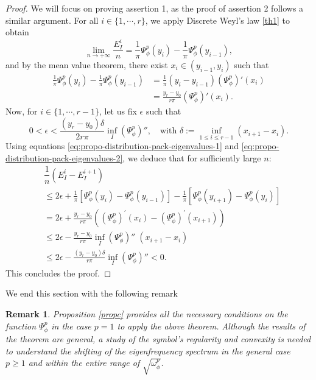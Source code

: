 \documentclass[11pt]{article}
\newtheorem{remark}{Remark}[section]
\begin{document}
\begin{proof}
We will focus on proving assertion 1, as the proof of assertion 2 follows a similar argument. For all $i \in \{1, \cdots, r\}$, we apply Discrete Weyl's law \ref{th1} to obtain
\begin{equation} \label{eq:propo-distribution-pack-eigenvalues-1}
\lim_{n\rightarrow  +\infty}\dfrac{E_I^{i}}{n}=\frac{1}{\pi}  \Psi^p_{\phi}(y_{i})-\frac{1}{\pi}  \Psi^p_{\phi}(y_{i-1}),
\end{equation}
and by the mean value theorem, there exist $x_i \in (y_{i-1}, y_i)$ such that
\begin{equation} \label{eq:propo-distribution-pack-eigenvalues-2}
\begin{split}
\frac{1}{\pi}  \Psi^p_{\phi}(y_{i})-\frac{1}{\pi}  \Psi^p_{\phi}(y_{i-1}) &= \frac{1}{\pi}(y_{i}-y_{i-1}) \left(  \Psi^p_{\phi}\right)'(x_i)\\
&= \frac{y_r-y_0}{r\pi}\left(  \Psi^p_{\phi}\right)'(x_i).
\end{split}
\end{equation}
Now, for $i \in \{1, \cdots, r-1\}$, let us fix $\epsilon$ such that
$$
0 < \epsilon < \frac{(y_r-y_0) \delta}{2r\pi} \inf_{I} \left(  \Psi^p_{\phi}   \right)'', \quad \text{with } \delta:= \inf_{1 \leq i \leq r-1} (x_{i+1} -x_{i} ). 
$$
Using equations \eqref{eq:propo-distribution-pack-eigenvalues-1} and \eqref{eq:propo-distribution-pack-eigenvalues-2}, we deduce that for sufficiently large $n$:
\begin{align*}
& \dfrac{1}{n}\left(E^i_{I} -E^{i+1}_I       \right) \\
&\leq 2\epsilon +\frac{1}{\pi}\left[    \Psi^p_{\phi}(y_{i})-  \Psi^p_{\phi}(y_{i-1})  \right] - \frac{1}{\pi} \left[   \Psi^p_{\phi}(y_{i+1})-  \Psi^p_{\phi}(y_{i})\right]\\
&=2\epsilon+ \frac{y_r-y_0}{r\pi}\left(   \left(  \Psi^p_{\phi}\right)^{'}(x_i) -\left(  \Psi^p_{\phi}\right)^{'}(x_{i+1})         \right)\\
&\leq 2\epsilon -\frac{y_r-y_0}{r\pi}\inf_{I} \left(  \Psi^p_{\phi}\right)'' \;(x_{i+1}-x_i)\\
&\leq 2\epsilon -\frac{(y_r-y_0) \delta}{r\pi} \inf_{I} \left(  \Psi^p_{\phi}\right)'' <0.
\end{align*}
This concludes the proof.
\end{proof}
We end this section with the following remark
\begin{remark}
Proposition \ref{propc} provides all the necessary conditions on the function $\Psi^p_{\phi}$ in the case $p=1$ to apply the above theorem. Although the results of the theorem are general, a study of the symbol's regularity and convexity is needed to understand the shifting of the eigenfrequency spectrum in the general case $p \geq 1$ and within the entire range of $\sqrt{\omega^p_{\phi}}$.
\end{remark}
\end{document}
